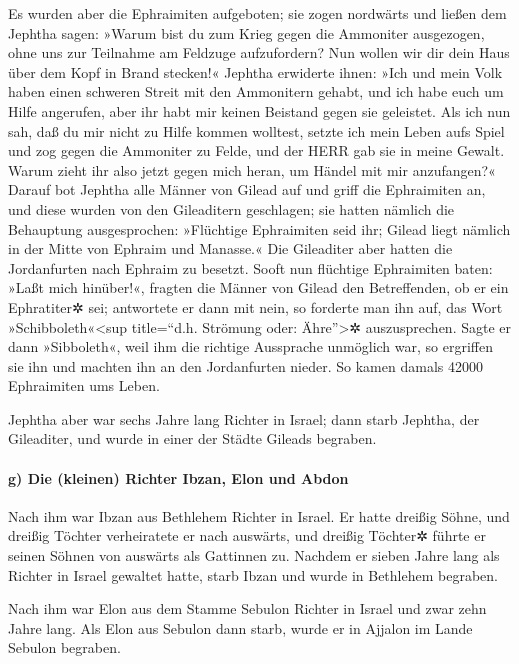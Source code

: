 Es wurden aber die Ephraimiten aufgeboten; sie zogen
nordwärts und ließen dem Jephtha sagen: »Warum bist du zum Krieg gegen
die Ammoniter ausgezogen, ohne uns zur Teilnahme am Feldzuge
aufzufordern? Nun wollen wir dir dein Haus über dem Kopf in Brand
stecken!« Jephtha erwiderte ihnen: »Ich und mein Volk
haben einen schweren Streit mit den Ammonitern gehabt, und ich habe euch
um Hilfe angerufen, aber ihr habt mir keinen Beistand gegen sie
geleistet. Als ich nun sah, daß du mir nicht zu Hilfe
kommen wolltest, setzte ich mein Leben aufs Spiel und zog gegen die
Ammoniter zu Felde, und der HERR gab sie in meine Gewalt. Warum zieht
ihr also jetzt gegen mich heran, um Händel mit mir anzufangen?«
Darauf bot Jephtha alle Männer von Gilead auf und griff
die Ephraimiten an, und diese wurden von den Gileaditern geschlagen; sie
hatten nämlich die Behauptung ausgesprochen: »Flüchtige Ephraimiten seid
ihr; Gilead liegt nämlich in der Mitte von Ephraim und Manasse.«
Die Gileaditer aber hatten die Jordanfurten nach Ephraim
zu besetzt. Sooft nun flüchtige Ephraimiten baten: »Laßt mich hinüber!«,
fragten die Männer von Gilead den Betreffenden, ob er ein Ephratiter✲
sei; antwortete er dann mit nein, so forderte man ihn auf,
das Wort »Schibboleth«\textless sup title=``d.h. Strömung oder:
Ähre''\textgreater✲ auszusprechen. Sagte er dann »Sibboleth«, weil ihm
die richtige Aussprache unmöglich war, so ergriffen sie ihn und machten
ihn an den Jordanfurten nieder. So kamen damals 42000 Ephraimiten ums
Leben.

Jephtha aber war sechs Jahre lang Richter in Israel; dann
starb Jephtha, der Gileaditer, und wurde in einer der Städte Gileads
begraben.

\hypertarget{g-die-kleinen-richter-ibzan-elon-und-abdon}{%
\paragraph{g) Die (kleinen) Richter Ibzan, Elon und
Abdon}\label{g-die-kleinen-richter-ibzan-elon-und-abdon}}

Nach ihm war Ibzan aus Bethlehem Richter in Israel.
Er hatte dreißig Söhne, und dreißig Töchter verheiratete
er nach auswärts, und dreißig Töchter✲ führte er seinen Söhnen von
auswärts als Gattinnen zu. Nachdem er sieben Jahre lang als Richter in
Israel gewaltet hatte, starb Ibzan und wurde in Bethlehem
begraben.

Nach ihm war Elon aus dem Stamme Sebulon Richter in
Israel und zwar zehn Jahre lang. Als Elon aus Sebulon
dann starb, wurde er in Ajjalon im Lande Sebulon begraben.

